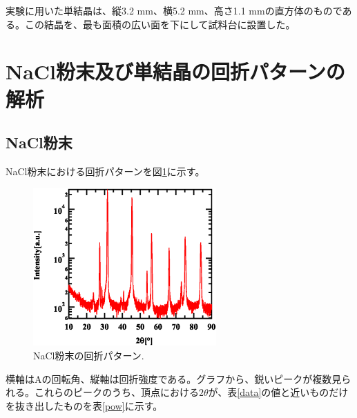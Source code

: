 \documentclass[11pt,a4j,uplatex]{jsarticle}
\begin{document}
\newpage
実験に用いた単結晶は、縦3.2 mm、横5.2 mm、高さ1.1 mmの直方体のものである。この結晶を、最も面積の広い面を下にして試料台に設置した。

\newpage
\section{NaCl粉末及び単結晶の回折パターンの解析}


\subsection{NaCl粉末}

NaCl粉末における回折パターンを図\ref{powder}に示す。

\begin{figure}[htb]
 \centering
 \includegraphics[clip,width=7cm]{FigPowder.eps}
 \caption{NaCl粉末の回折パターン.}
 \label{powder}
\end{figure}

横軸はAの回転角、縦軸は回折強度である。グラフから、鋭いピークが複数見られる。これらのピークのうち、頂点における$2\theta$が、表\ref{data}の値と近いものだけを抜き出したものを表\ref{pow}に示す。
\end{document}
